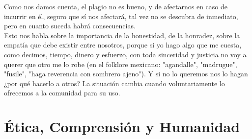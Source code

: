 \documentclass[12pt]{book} %
\begin{document}
Como nos damos cuenta, el plagio no es bueno, y de afectarnos en caso de incurrir en él, seguro que sí nos afectará, tal vez no se descubra de inmediato, pero en cuanto suceda habrá consecuencias.\\

Esto nos habla sobre la importancia de la honestidad, de la honradez, sobre la empatía que debe existir entre nosotros, porque si yo hago algo que me cuesta, como decimos, tiempo, dinero y esfuerzo, con toda sinceridad y justicia no voy a querer que otro me lo robe (en el folklore mexicano: "agandalle", "madrugue", "fusile", "haga reverencia con sombrero ajeno"). Y si no lo queremos nos lo hagan ¿por qué hacerlo a otros? La situación cambia cuando voluntariamente lo ofrecemos a la comunidad para su uso.

\section{Ética, Comprensión y Humanidad}
\end{document}
